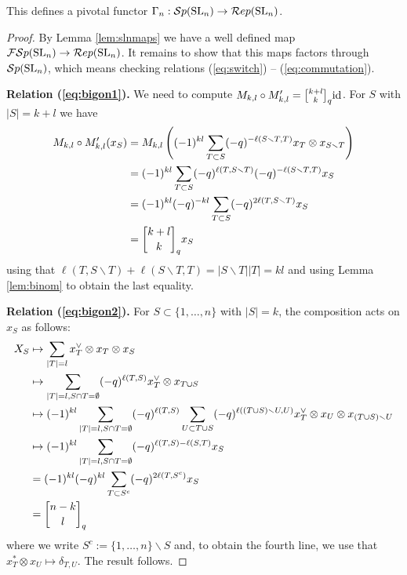 \documentclass[11pt]{amsart}
\begin{document}
\begin{thm}\label{thm:gamma}
This defines a pivotal functor $\Gamma_n: {\mathcal{S}p}({\rm{SL}}_n) \rightarrow \mathcal{R}ep({\rm{SL}}_n)$.
\end{thm}
\begin{proof}
By Lemma \ref{lem:slnmaps} we have a well defined map ${\mathcal{FS}p}({\rm{SL}}_n) \rightarrow \mathcal{R}ep({\rm{SL}}_n)$. It remains to show that this maps factors through ${\mathcal{S}p}({\rm{SL}}_n)$, which means checking relations (\ref{eq:switch}) -- (\ref{eq:commutation}).

{\bf Relation (\ref{eq:bigon1}).} We need to compute $M_{k,l} \circ M'_{k,l} = \qBinomial{k+l}{k} {\rm{id}}$. For $S $ with $|S|=k+l$ we have
\begin{align*}
M_{k,l} \circ M'_{k,l}(x_S)
&= M_{k,l} \left( (-1)^{kl} \sum_{T \subset S} (-q)^{- \ell( S \smallsetminus T, T)} x_T \otimes x_{S \smallsetminus T} \right) \\
&= (-1)^{kl}\sum_{T \subset S} (-q)^{\ell(T, S \smallsetminus T)} (-q)^{- \ell( S \smallsetminus T, T)} x_S \\
&= (-1)^{kl} (-q)^{-kl} \sum_{T \subset S} (-q)^{2\ell(T, S \smallsetminus T)} x_S \\
&= \qBinomial{k+l}{k} x_S
\end{align*}
using that $ \ell(T, S \smallsetminus T) + \ell( S \smallsetminus T, T) = |S \smallsetminus T||T| =kl$ and using Lemma \ref{lem:binom} to obtain the last equality. 


{\bf Relation (\ref{eq:bigon2}).} For $S \subset \{1,\dots,n\}$ with $|S|=k$, the composition acts on $x_S$ as follows:
\begin{align*}
X_S
&\mapsto \sum_{|T|=l} x_T^\vee \otimes x_T \otimes x_S \\
&\mapsto \sum_{|T|=l, S \cap T = \emptyset} (-q)^{\ell(T,S)} x_T^\vee \otimes x_{T \cup S} \\
&\mapsto (-1)^{kl} \sum_{|T|=l, S \cap T = \emptyset} (-q)^{\ell(T,S)} \sum_{U \subset T \cup S} (-q)^{\ell((T \cup S) \smallsetminus U,U)} x_T^\vee \otimes x_U \otimes x_{(T \cup S) \smallsetminus U} \\
&\mapsto (-1)^{kl} \sum_{|T|=l, S \cap T = \emptyset} (-q)^{\ell(T,S) - \ell(S,T)} x_S \\
&= (-1)^{kl} (-q)^{kl} \sum_{T \subset S^c} (-q)^{2\ell(T, S^c)} x_S \\
&= \qBinomial{n-k}{l}
\end{align*}
where we write $S^c := \{1, \dots, n\} \smallsetminus S$ and, to obtain the fourth line, we use that $x_T^* \otimes x_U \mapsto \delta_{T,U}$. The result follows.


\end{proof}
\end{document}
